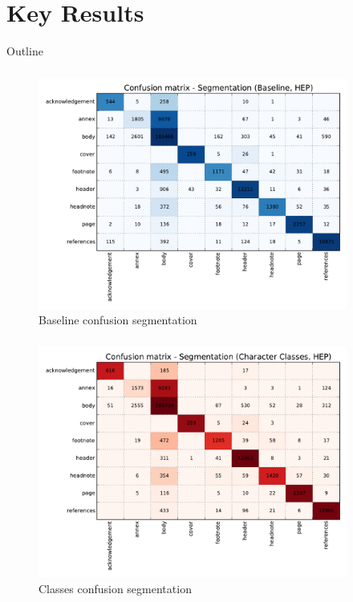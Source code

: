 \documentclass{beamer}
\begin{document}
\section{Key Results}


\begin{frame}[noframenumbering]{Outline}
\end{frame}


\begin{frame}
\frametitle{}
\begin{figure}[h]
\center
\includegraphics[width=4in]{Figures/baseline_confusion_segmentation.pdf}
\caption{Baseline confusion segmentation}
\end{figure}
\end{frame}


\begin{frame}
\frametitle{}
\begin{figure}[h]
\center
\includegraphics[width=4in]{Figures/classes_confusion_segmentation.pdf}
\caption{Classes confusion segmentation}
\end{figure}
\end{frame}
\end{document}
